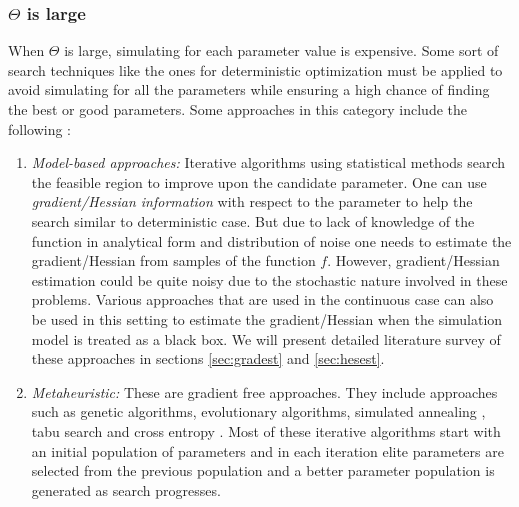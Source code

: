 \subsubsection{$\Theta$ is large}
When $\Theta$ is large, simulating for each parameter value is expensive. Some sort of search techniques like the ones for deterministic optimization must be applied to avoid simulating for all the parameters while ensuring a high chance of finding the best or good parameters. Some approaches in this category include the following : 
\begin{enumerate}
\item \emph{Model-based approaches:} Iterative algorithms using statistical methods search the feasible region to improve upon the candidate parameter. One can  use \emph{gradient/Hessian information} with respect to the parameter to help the search similar to deterministic case. But due to lack of knowledge of the function in analytical form and distribution of noise one needs to estimate the gradient/Hessian from samples of the function $f$. However, gradient/Hessian  estimation could be  quite noisy due to the stochastic nature involved  in these problems. Various approaches  that are used in the continuous case can also be used in this setting to estimate the gradient/Hessian when the simulation model is treated as a black box. We will present detailed literature survey of these approaches in sections \ref{sec:gradest} and \ref{sec:hesest}. 
\item \emph{Metaheuristic:} These are gradient free approaches. They include approaches such as genetic algorithms, evolutionary algorithms, simulated annealing \cite{simann}, tabu search \cite{tabu} and cross entropy \cite{crossent}. Most of these iterative algorithms start with an initial population of parameters and in each iteration elite parameters are selected from the previous population and a better parameter population is generated as search progresses. 
\end{enumerate}


